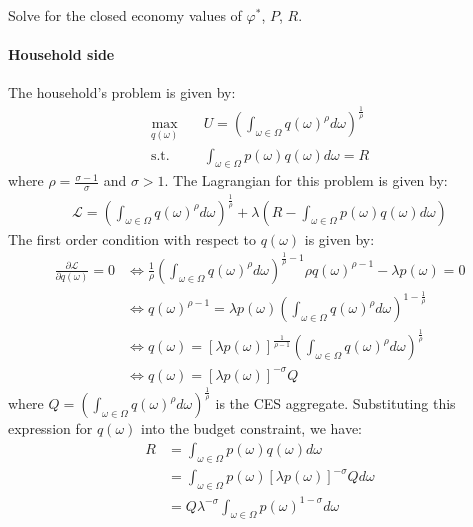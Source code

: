 Solve for the closed economy values of $\varphi^*$, $P$, $R$.

\begin{solution}
    \paragraph{Household side} The household's problem is given by:
    \begin{align*}
        \max_{q(\omega)} \quad & U = \left( \int_{\omega \in \Omega} q(\omega)^{\rho} d\omega \right)^{\frac{1}{\rho}} \\
        \text{s.t.} \quad & \int_{\omega \in \Omega} p(\omega) q(\omega) d\omega = R
    \end{align*}
    where $\rho = \frac{\sigma - 1}{\sigma}$ and $\sigma > 1$. The Lagrangian for this problem is given by:
    \begin{align*}
        \mathcal{L} = \left( \int_{\omega \in \Omega} q(\omega)^{\rho} d\omega \right)^{\frac{1}{\rho}} + \lambda \left( R - \int_{\omega \in \Omega} p(\omega) q(\omega) d\omega \right)
    \end{align*}
    The first order condition with respect to $q(\omega)$ is given by:
    \begin{align*}
        \frac{\partial \mathcal{L}}{\partial q(\omega)} = 0 &\iff \frac{1}{\rho} \left( \int_{\omega \in \Omega} q(\omega)^{\rho} d\omega \right)^{\frac{1}{\rho} - 1} \rho q(\omega)^{\rho - 1} - \lambda p(\omega) = 0 \\
        &\iff q(\omega)^{\rho - 1} = \lambda p(\omega) \left( \int_{\omega \in \Omega} q(\omega)^{\rho} d\omega \right)^{1 - \frac{1}{\rho}} \\
        &\iff q(\omega) = \left[ \lambda p(\omega) \right]^{\frac{1}{\rho - 1}} \left( \int_{\omega \in \Omega} q(\omega)^{\rho} d\omega \right)^{\frac{1}{\rho} } \\
        &\iff q(\omega) = \left[ \lambda p(\omega) \right]^{-\sigma} Q 
    \end{align*}
    where $Q = \left( \int_{\omega \in \Omega} q(\omega)^{\rho} d\omega \right)^{\frac{1}{\rho}}$ is the CES aggregate. Substituting this expression for $q(\omega)$ into the budget constraint, we have:
    \begin{align*}
        R &= \int_{\omega \in \Omega} p(\omega) q(\omega) d\omega \\
        &= \int_{\omega \in \Omega} p(\omega) \left[ \lambda p(\omega) \right]^{-\sigma} Q d\omega \\
        &= Q \lambda^{-\sigma} \int_{\omega \in \Omega} p(\omega)^{1 - \sigma} d\omega \\

\end{align*}
\end{solution}
